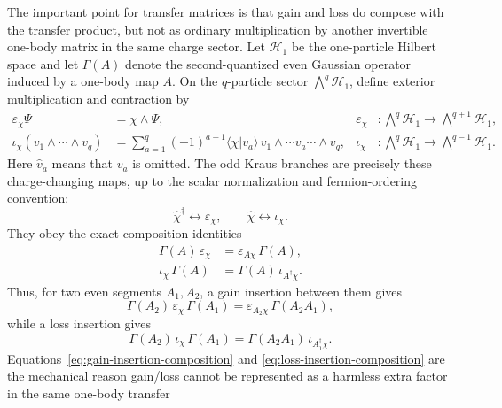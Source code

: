 \documentclass[aps,prb,onecolumn,nofootinbib,superscriptaddress]{revtex4-2}
\newcommand{\cH}{\mathcal{H}}
\theoremstyle{plain}
\theoremstyle{definition}
\begin{document}
The important point for transfer matrices is that gain and loss do compose
with the transfer product, but not as ordinary multiplication by another
invertible one-body matrix in the same charge sector.  Let
\(\cH_1\) be the one-particle Hilbert space and let \(\Gamma(A)\) denote the
second-quantized even Gaussian operator induced by a one-body map \(A\).  On
the \(q\)-particle sector \(\bigwedge^q\cH_1\), define exterior multiplication
and contraction by
\begin{align}
  \varepsilon_\chi \Psi &= \chi\wedge\Psi,
  &
  \varepsilon_\chi&:\bigwedge^q\cH_1\to\bigwedge^{q+1}\cH_1,
  \label{eq:exterior-creation-map}\\
  \iota_\chi(v_1\wedge\cdots\wedge v_q)
  &=
  \sum_{a=1}^{q}(-1)^{a-1}
  \langle\chi|v_a\rangle\,
  v_1\wedge\cdots\widehat{v_a}\cdots\wedge v_q,
  &
  \iota_\chi&:\bigwedge^q\cH_1\to\bigwedge^{q-1}\cH_1 .
  \label{eq:interior-annihilation-map}
\end{align}
Here \(\widehat v_a\) means that \(v_a\) is omitted.  The odd Kraus branches
are precisely these charge-changing maps, up to the scalar normalization and
fermion-ordering convention:
\begin{equation}
  \hat\chi^\dagger \leftrightarrow \varepsilon_\chi,
  \qquad
  \hat\chi \leftrightarrow \iota_\chi .
  \label{eq:odd-branch-exterior-interior}
\end{equation}
They obey the exact composition identities
\begin{align}
  \Gamma(A)\,\varepsilon_\chi
  &=
  \varepsilon_{A\chi}\,\Gamma(A),
  \label{eq:even-creation-composition}\\
  \iota_\chi\,\Gamma(A)
  &=
  \Gamma(A)\,\iota_{A^\dagger\chi}.
  \label{eq:even-annihilation-composition}
\end{align}
Thus, for two even segments \(A_1,A_2\), a gain insertion between them gives
\begin{equation}
  \Gamma(A_2)\,\varepsilon_\chi\,\Gamma(A_1)
  =
  \varepsilon_{A_2\chi}\,\Gamma(A_2A_1),
  \label{eq:gain-insertion-composition}
\end{equation}
while a loss insertion gives
\begin{equation}
  \Gamma(A_2)\,\iota_\chi\,\Gamma(A_1)
  =
  \Gamma(A_2A_1)\,\iota_{A_1^\dagger\chi}.
  \label{eq:loss-insertion-composition}
\end{equation}
Equations~\eqref{eq:gain-insertion-composition} and
\eqref{eq:loss-insertion-composition} are the mechanical reason gain/loss
cannot be represented as a harmless extra factor in the same one-body transfer
\end{document}
